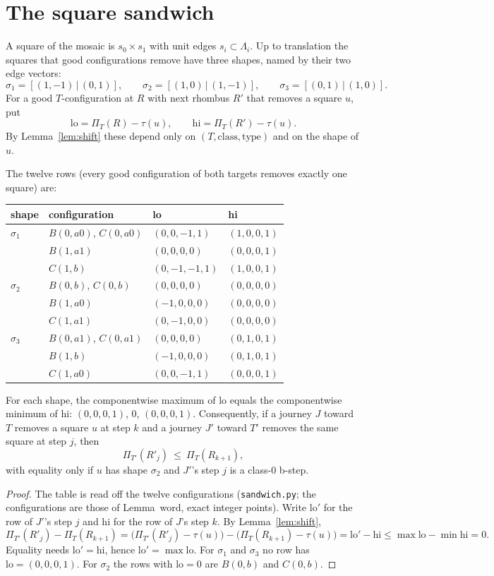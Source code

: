 \documentclass[11pt]{article}
\theoremstyle{definition}\newtheorem{definition}[theorem]{Definition}\newtheorem{remark}[theorem]{Remark}
\begin{document}
\section{The square sandwich}\label{sec:sand}
A square of the mosaic is $s_0\times s_1$ with unit edges $s_i\subset\Lambda_i$. Up to translation the squares that good configurations remove have three shapes, named by their two edge vectors:
\[\sigma_1=[(1,-1)\,|\,(0,1)],\qquad \sigma_2=[(1,0)\,|\,(1,-1)],\qquad \sigma_3=[(0,1)\,|\,(1,0)].\]
For a good $T$-configuration at $R$ with next rhombus $R'$ that removes a square $u$, put
\[\mathrm{lo}=\Pi_T(R)-\tau(u),\qquad \mathrm{hi}=\Pi_T(R')-\tau(u).\]
By Lemma~\ref{lem:shift} these depend only on $(T,\text{class},\text{type})$ and on the shape of $u$.

\begin{lemma}\label{lem:sand}
The twelve rows (every good configuration of both targets removes exactly one square) are:
\begin{center}\small\begin{tabular}{llll}\toprule
shape & configuration & lo & hi\\\midrule
$\sigma_1$ & $B(0,a0)$, $C(0,a0)$ & $(0,0,-1,1)$ & $(1,0,0,1)$\\
 & $B(1,a1)$ & $(0,0,0,0)$ & $(0,0,0,1)$\\
 & $C(1,b)$ & $(0,-1,-1,1)$ & $(1,0,0,1)$\\\midrule
$\sigma_2$ & $B(0,b)$, $C(0,b)$ & $(0,0,0,0)$ & $(0,0,0,0)$\\
 & $B(1,a0)$ & $(-1,0,0,0)$ & $(0,0,0,0)$\\
 & $C(1,a1)$ & $(0,-1,0,0)$ & $(0,0,0,0)$\\\midrule
$\sigma_3$ & $B(0,a1)$, $C(0,a1)$ & $(0,0,0,0)$ & $(0,1,0,1)$\\
 & $B(1,b)$ & $(-1,0,0,0)$ & $(0,1,0,1)$\\
 & $C(1,a0)$ & $(0,0,-1,1)$ & $(0,0,0,1)$\\\bottomrule
\end{tabular}\end{center}
For each shape, the componentwise maximum of lo equals the componentwise minimum of hi: $(0,0,0,1)$, $0$, $(0,0,0,1)$. Consequently, if a journey $J$ toward $T$ removes a square $u$ at step $k$ and a journey $J'$ toward $T'$ removes the same square at step $j$, then
\[\Pi_{T'}(R'_j)\ \le\ \Pi_T(R_{k+1}),\]
with equality only if $u$ has shape $\sigma_2$ and $J'$'s step $j$ is a class-$0$ b-step.
\end{lemma}
\begin{proof}
The table is read off the twelve configurations (\texttt{sandwich.py}; the configurations are those of Lemma~word, exact integer points). Write $\mathrm{lo}'$ for the row of $J'$'s step $j$ and $\mathrm{hi}$ for the row of $J$'s step $k$. By Lemma~\ref{lem:shift},
\[\Pi_{T'}(R'_j)-\Pi_T(R_{k+1})=\bigl(\Pi_{T'}(R'_j)-\tau(u)\bigr)-\bigl(\Pi_T(R_{k+1})-\tau(u)\bigr)=\mathrm{lo}'-\mathrm{hi}\le\max\mathrm{lo}-\min\mathrm{hi}=0.\]
Equality needs $\mathrm{lo}'=\mathrm{hi}$, hence $\mathrm{lo}'=\max\mathrm{lo}$. For $\sigma_1$ and $\sigma_3$ no row has $\mathrm{lo}=(0,0,0,1)$. For $\sigma_2$ the rows with $\mathrm{lo}=0$ are $B(0,b)$ and $C(0,b)$.
\end{proof}
\end{document}

